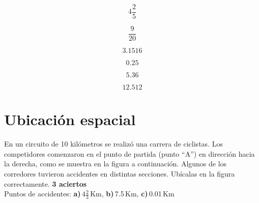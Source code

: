\documentclass[11pt]{article}
\begin{document}
\begin{multicols}{2}

    \begin{equation}  4\frac{2}{5} \nonumber \end{equation}
    
    \vspace{5mm}

    \begin{equation}  \frac{9}{20} \nonumber \end{equation}
    
    \vspace{5mm}

    \begin{equation}  3.1516 \nonumber \end{equation}
    
    \vspace{5mm}

    \begin{equation}  0.25 \nonumber \end{equation}
    
    \vspace{5mm}

    \begin{equation}  5.36 \nonumber    \end{equation}
    
    \vspace{5mm}

    \begin{equation}  12.512 \nonumber  \end{equation}
\end{multicols}

\vspace{1cm}


\section{Ubicaci\'on espacial}
En un circuito de 10 kil\'ometros se realiz\'o una carrera de ciclistas. Los
competidores comenzaron en el punto de partida (punto ``A'') en direcci\'on
hacia la derecha, como se muestra en la figura a continuaci\'on. Algunos de los
corredores tuvieron accidentes en distintas secciones. Ub\'icalas en la figura
correctamente.  \hfill \textbf{3 aciertos}\\

Puntos de accidentes: \hspace{3mm} \textbf{a)}\,$4\frac{2}{3}$\,Km, \hspace{3mm}
\textbf{b)}\,7.5\,Km, \hspace{3mm} \textbf{c)}\,0.01\,Km
\end{document}
